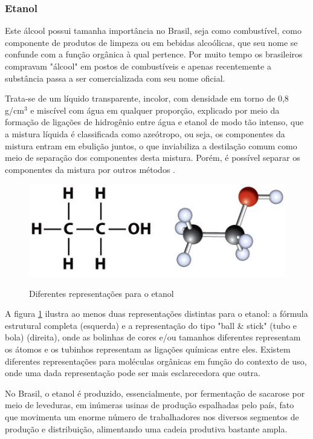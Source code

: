 \subsubsection{Etanol}
Este álcool possui tamanha importância no Brasil, seja como combustível, como componente de produtos de limpeza ou em bebidas alcoólicas, que seu nome se confunde com a função orgânica à qual pertence. Por muito tempo os brasileiros compravam "álcool" em postos de combustíveis e apenas recentemente a substância passa a ser comercializada com seu nome oficial.

Trata-se de um líquido transparente, incolor, com densidade em torno de 0,8 g/cm$^3$ e miscível com água em qualquer proporção, explicado por meio da formação de ligações de hidrogênio entre água e etanol de modo tão intenso, que a mistura líquida é classificada como azeótropo, ou seja, os componentes da mistura entram em ebulição juntos, o que inviabiliza a destilação comum como meio de separação dos componentes desta mistura. Porém, é possível separar os componentes da mistura por outros métodos \cite{trica}.

\begin{figure}[h]
	\centering
	\caption{Diferentes representações para o etanol}
	\vspace{0.5cm}
	\includegraphics[width=0.75\linewidth]{imagens/etanol2.jpeg}
	\label{fig:etanol2}
\end{figure}

A figura \ref{fig:etanol2} ilustra ao menos duas representações distintas para o etanol: a fórmula estrutural completa (esquerda) e a representação do tipo "ball \& stick" (tubo e bola) (direita), onde as bolinhas de cores e/ou tamanhos diferentes representam os átomos e os tubinhos representam as ligações químicas entre eles. Existem diferentes representações para moléculas orgânicas em função do contexto de uso, onde uma dada representação pode ser mais esclarecedora que outra.

No Brasil, o etanol é produzido, essencialmente, por fermentação de sacarose por meio de leveduras, em inúmeras usinas de produção espalhadas pelo país, fato que movimenta um enorme número de trabalhadores nos diversos segmentos de produção e distribuição, alimentando uma cadeia produtiva bastante ampla.

